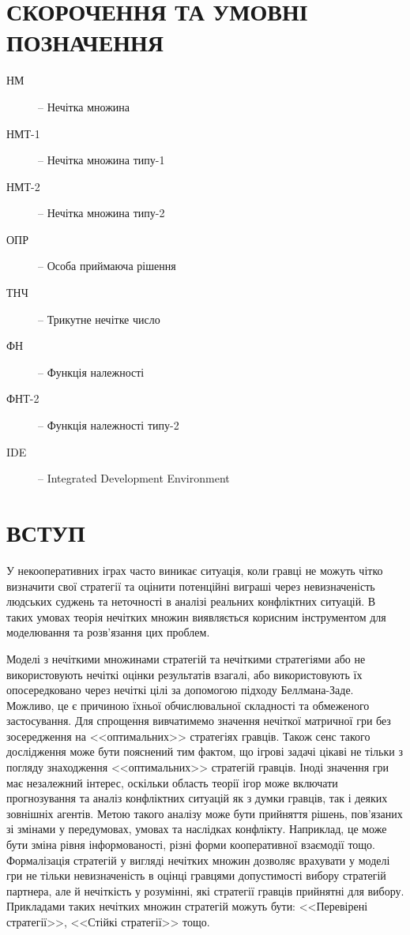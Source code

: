 \documentclass[14pt, a4paper, oneside]{extarticle}
\numberwithin{equation}{section}
\begin{document}
\renewcommand{\cftbeforesecskip}{0.5ex}
\renewcommand{\cftbeforesubsecskip}{0.5ex}
\renewcommand{\cftbeforesubsubsecskip}{0.5ex}

\tableofcontents

\thispagestyle{empty}


\section*{СКОРОЧЕННЯ ТА УМОВНІ ПОЗНАЧЕННЯ}

\begin{description}
    \item[НМ] -- Нечітка множина
    \item[НМТ-1] -- Нечітка множина типу-1
    \item[НМТ-2] -- Нечітка множина типу-2
    \item[ОПР] -- Особа приймаюча рішення
    \item[ТНЧ] -- Трикутне нечітке число
    \item[ФН] -- Функція належності
    \item[ФНТ-2] -- Функція належності типу-2
    \item[IDE] -- Integrated Development Environment
\end{description}


\section*{ВСТУП}
У некооперативних іграх часто виникає ситуація, коли гравці не можуть чітко визначити свої стратегії та оцінити потенційні виграші через невизначеність людських суджень та неточності в аналізі реальних конфліктних ситуацій. В таких умовах теорія нечітких множин виявляється корисним інструментом для моделювання та розв'язання цих проблем.

Моделі з нечіткими множинами стратегій та нечіткими стратегіями або не використовують нечіткі оцінки результатів взагалі, або використовують їх опосередковано через нечіткі цілі за допомогою підходу Беллмана-Заде. Можливо, це є причиною їхньої обчислювальної складності та обмеженого застосування. Для спрощення вивчатимемо значення нечіткої матричної гри без зосередження на <<оптимальних>> стратегіях гравців. Також сенс такого дослідження може бути пояснений тим фактом, що ігрові задачі цікаві не тільки з погляду знаходження <<оптимальних>> стратегій гравців. Іноді значення гри має незалежний інтерес, оскільки область теорії ігор може включати прогнозування та аналіз конфліктних ситуацій як з думки гравців, так і деяких зовнішніх агентів. Метою такого аналізу може бути прийняття рішень, пов'язаних зі змінами у передумовах, умовах та наслідках конфлікту. Наприклад, це може бути зміна рівня інформованості, різні форми кооперативної взаємодії тощо. Формалізація стратегій у вигляді нечітких множин дозволяє врахувати у моделі гри не тільки невизначеність в оцінці гравцями допустимості вибору стратегій партнера, але й нечіткість у розумінні, які стратегії гравців прийнятні для вибору. Прикладами таких нечітких множин стратегій можуть бути: <<Перевірені стратегії>>, <<Стійкі стратегії>> тощо.
\end{document}
